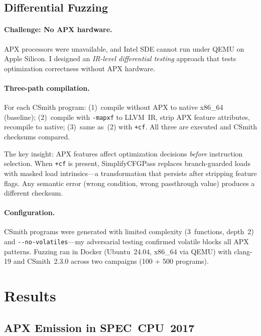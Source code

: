 \documentclass[acmsmall,nonacm]{acmart}
\begin{document}
\subsection{Differential Fuzzing}

\paragraph{Challenge: No APX hardware.}
APX processors were unavailable, and Intel SDE cannot run under QEMU
on Apple Silicon. I designed an \emph{IR-level differential testing}
approach that tests optimization correctness without APX hardware.

\paragraph{Three-path compilation.}
For each CSmith program: (1)~compile without APX to native x86\_64
(baseline); (2)~compile with \texttt{-mapxf} to LLVM~IR, strip APX
feature attributes, recompile to native; (3)~same as~(2) with
\texttt{+cf}. All three are executed and CSmith checksums compared.

The key insight: APX features affect optimization decisions
\emph{before} instruction selection. When \texttt{+cf} is present,
SimplifyCFGPass replaces branch-guarded loads with masked load
intrinsics---a transformation that persists after stripping feature
flags. Any semantic error (wrong condition, wrong passthrough value)
produces a different checksum.

\paragraph{Configuration.}
CSmith programs were generated with limited complexity (3~functions,
depth~2) and \mbox{\texttt{-{}-no-volatiles}}---my adversarial
testing confirmed volatile blocks all APX patterns. Fuzzing ran in
Docker (Ubuntu~24.04, x86\_64 via QEMU) with clang-19 and
CSmith~2.3.0 across two campaigns (100 + 500 programs).


\section{Results}

\subsection{APX Emission in SPEC~CPU~2017}
\end{document}

